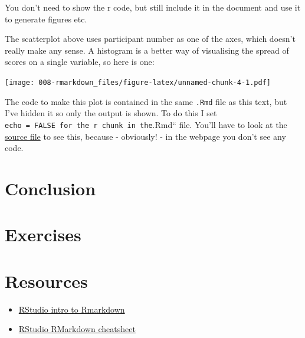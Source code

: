 \documentclass[]{book}
\providecommand{\tightlist}{%
  \setlength{\itemsep}{0pt}\setlength{\parskip}{0pt}}
\begin{document}
You don't need to show the r code, but still include it in the document
and use it to generate figures etc.

The scatterplot above uses participant number as one of the axes, which
doesn't really make any sense. A histogram is a better way of
visualising the spread of scores on a single variable, so here is one:

\texttt{[image: 008-rmarkdown\_files/figure-latex/unnamed-chunk-4-1.pdf]}

The code to make this plot is contained in the same \texttt{.Rmd} file
as this text, but I've hidden it so only the output is shown. To do this
I set
\texttt{echo\ =\ FALSE\textquotesingle{}\textquotesingle{}\ for\ the\ r\ chunk\ in\ the}.Rmd``
file. You'll have to look at the
\href{https://github.com/tomstafford/psy6422/blob/master/008-rmarkdown.Rmd}{source
file} to see this, because - obviously! - in the webpage you don't see
any code.

\section{Conclusion}\label{conclusion}

\section{Exercises}\label{exercises}

\section{Resources}\label{resources}

\begin{itemize}
\tightlist
\item
  \href{https://rmarkdown.rstudio.com/}{RStudio intro to Rmarkdown}
\item
  \href{https://github.com/rstudio/cheatsheets/raw/master/rmarkdown-2.0.pdf}{RStudio
  RMarkdown cheatsheet}
\end{itemize}
\end{document}
